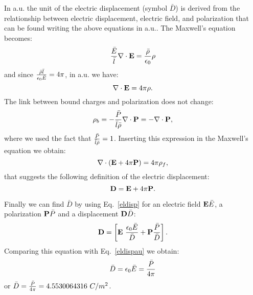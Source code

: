 \documentclass[12pt,a4paper]{article}
\def\bard{4.5530064316}
\begin{document}
{\color{web-blue} In a.u. the unit of the electric displacement 
(symbol $\bar D$) is derived from the 
relationship between electric displacement, electric field, and polarization
that can be found writing the above equations in a.u.. The Maxwell's
equation becomes:
\begin{equation}
{\bar E \over \bar l} \nabla \cdot {\bf E} = {\bar \rho \over \epsilon_0}
\rho
\label{maxwell1gen}
\end{equation}
and since ${\bar \rho \bar l \over \epsilon_0 \bar E}=4\pi$, in a.u. we have:
\begin{equation}
\nabla \cdot {\bf E} = 4 \pi \rho.
\end{equation}
The link between bound charges and polarization does not change:
\begin{equation}
\rho_b = -{\bar P \over \bar l \bar \rho} \nabla \cdot {\bf P}=
-\nabla \cdot {\bf P},
\end{equation}
where we used the fact that ${\bar P \over \bar l \bar \rho}=1$.
Inserting this expression in the Maxwell's equation we obtain:
\begin{equation}
\nabla \cdot ({\bf E}+ 4 \pi {\bf P})=4 \pi \rho_f, 
\end{equation}
that suggests the following definition of the electric displacement:
\begin{equation}
{\bf D}={\bf E} + 4\pi {\bf P}.
\label{eldispau}
\end{equation}

Finally we can find $\bar D$ by using Eq.~\ref{eldisp} for an electric
field ${\bf E} \bar E$, a polarization ${\bf P} \bar P$ and a
displacement ${\bf D} \bar D$:
\begin{equation}
{\bf D} = \left[{\bf E}\ {\epsilon_0 \bar E\over \bar D} + 
{\bf P} {\bar P\over \bar D}\right].
\label{eldispgen}
\end{equation}
Comparing this equation with Eq.~\ref{eldispau} we obtain:
\begin{equation}
\bar D= {\epsilon_0 \bar E}= {\bar P \over 4 \pi}
\end{equation}
or $\bar D= {\bar P\over 4 \pi}=\bard\ C/m^2$.
\\
}
\end{document}

